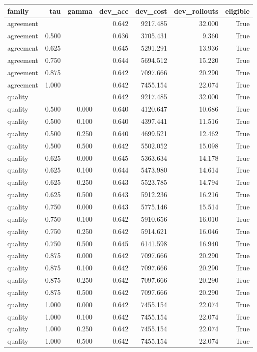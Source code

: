 \begin{tabular}{lrrrrrr}
\toprule
family & tau & gamma & dev\_acc & dev\_cost & dev\_rollouts & eligible \\
\midrule
agreement &  &  & 0.642 & 9217.485 & 32.000 & True \\
agreement & 0.500 &  & 0.636 & 3705.431 & 9.360 & True \\
agreement & 0.625 &  & 0.645 & 5291.291 & 13.936 & True \\
agreement & 0.750 &  & 0.644 & 5694.512 & 15.220 & True \\
agreement & 0.875 &  & 0.642 & 7097.666 & 20.290 & True \\
agreement & 1.000 &  & 0.642 & 7455.154 & 22.074 & True \\
quality &  &  & 0.642 & 9217.485 & 32.000 & True \\
quality & 0.500 & 0.000 & 0.640 & 4120.647 & 10.686 & True \\
quality & 0.500 & 0.100 & 0.640 & 4397.441 & 11.516 & True \\
quality & 0.500 & 0.250 & 0.640 & 4699.521 & 12.462 & True \\
quality & 0.500 & 0.500 & 0.642 & 5502.052 & 15.098 & True \\
quality & 0.625 & 0.000 & 0.645 & 5363.634 & 14.178 & True \\
quality & 0.625 & 0.100 & 0.644 & 5473.980 & 14.614 & True \\
quality & 0.625 & 0.250 & 0.643 & 5523.785 & 14.794 & True \\
quality & 0.625 & 0.500 & 0.643 & 5912.236 & 16.216 & True \\
quality & 0.750 & 0.000 & 0.643 & 5775.146 & 15.514 & True \\
quality & 0.750 & 0.100 & 0.642 & 5910.656 & 16.010 & True \\
quality & 0.750 & 0.250 & 0.642 & 5914.621 & 16.046 & True \\
quality & 0.750 & 0.500 & 0.645 & 6141.598 & 16.940 & True \\
quality & 0.875 & 0.000 & 0.642 & 7097.666 & 20.290 & True \\
quality & 0.875 & 0.100 & 0.642 & 7097.666 & 20.290 & True \\
quality & 0.875 & 0.250 & 0.642 & 7097.666 & 20.290 & True \\
quality & 0.875 & 0.500 & 0.642 & 7097.666 & 20.290 & True \\
quality & 1.000 & 0.000 & 0.642 & 7455.154 & 22.074 & True \\
quality & 1.000 & 0.100 & 0.642 & 7455.154 & 22.074 & True \\
quality & 1.000 & 0.250 & 0.642 & 7455.154 & 22.074 & True \\
quality & 1.000 & 0.500 & 0.642 & 7455.154 & 22.074 & True \\
\bottomrule
\end{tabular}
